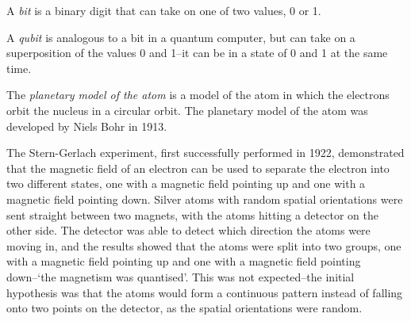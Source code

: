 
\begin{definition}
    A \emph{bit} is a binary digit that can take on one of two values, 0 or 1.
\end{definition}
\begin{definition}
    A \emph{qubit} is analogous to a bit in a quantum computer, but can take on a superposition of the values 0 and 1–it can be in a state of 0 and 1 at the same time.
\end{definition}
\begin{definition}
    The \emph{planetary model of the atom} is a model of the atom in which the electrons orbit the nucleus in a circular orbit. The planetary model of the atom was developed by Niels Bohr in 1913.
\end{definition}
The Stern-Gerlach experiment, first successfully performed in 1922, demonstrated that the magnetic field of an electron can be used to separate the electron into two different states, one with a magnetic field pointing up and one with a magnetic field pointing down. Silver atoms with random spatial orientations were sent straight between two magnets, with the atoms hitting a detector on the other side. The detector was able to detect which direction the atoms were moving in, and the results showed that the atoms were split into two groups, one with a magnetic field pointing up and one with a magnetic field pointing down–`the magnetism was quantised'. This was not expected–the initial hypothesis was that the atoms would form a continuous pattern instead of falling onto two points on the detector, as the spatial orientations were random.
